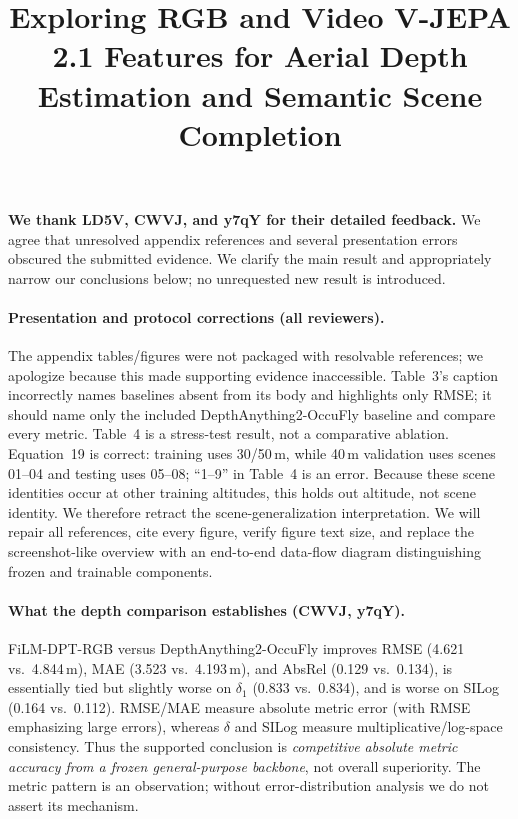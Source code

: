 \documentclass[10pt,twocolumn,letterpaper]{article}
\begin{document}
\title{Exploring RGB and Video V-JEPA 2.1 Features for Aerial Depth Estimation and Semantic Scene Completion}
\maketitle
\thispagestyle{empty}
\appendix

\noindent\textbf{We thank LD5V, CWVJ, and y7qY for their detailed feedback.}
We agree that unresolved appendix references and several presentation errors obscured the
submitted evidence. We clarify the main result and appropriately narrow our conclusions
below; no unrequested new result is introduced.

\paragraph{Presentation and protocol corrections (all reviewers).}
The appendix tables/figures were not packaged with resolvable references; we apologize
because this made supporting evidence inaccessible. Table~3's caption incorrectly names
baselines absent from its body and highlights only RMSE; it should name only the included
DepthAnything2-OccuFly baseline and compare every metric. Table~4 is a stress-test result,
not a comparative ablation. Equation~19 is correct: training uses 30/50\,m, while 40\,m
validation uses scenes 01--04 and testing uses 05--08; ``1--9'' in Table~4 is an error.
Because these scene identities occur at other training altitudes, this holds out altitude,
not scene identity. We therefore retract the scene-generalization interpretation. We will
repair all references, cite every figure, verify figure text size, and replace the
screenshot-like overview with an end-to-end data-flow diagram distinguishing frozen and
trainable components.

\paragraph{What the depth comparison establishes (CWVJ, y7qY).}
FiLM-DPT-RGB versus DepthAnything2-OccuFly improves RMSE (4.621 vs.~4.844\,m), MAE
(3.523 vs.~4.193\,m), and AbsRel (0.129 vs.~0.134), is essentially tied but slightly worse
on $\delta_1$ (0.833 vs.~0.834), and is worse on SILog (0.164 vs.~0.112). RMSE/MAE measure
absolute metric error (with RMSE emphasizing large errors), whereas $\delta$ and SILog
measure multiplicative/log-space consistency. Thus the supported conclusion is
\emph{competitive absolute metric accuracy from a frozen general-purpose backbone}, not
overall superiority. The metric pattern is an observation; without error-distribution
analysis we do not assert its mechanism.
\end{document}
